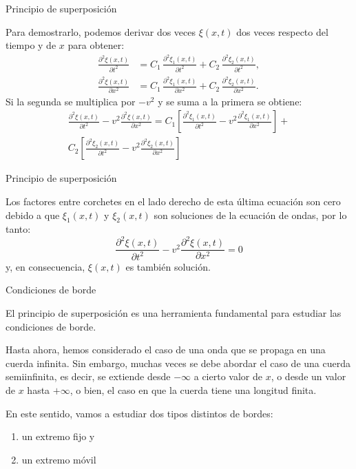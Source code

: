 \documentclass[11pt,handout,aspectratio=1610]{beamer}
\newcommand{\pddiff}[2]{\frac{\partial^2 #1}{\partial #2^2}}
\newcommand{\vs}{\vspace{11pt}}
\begin{document}
\begin{frame}{Principio de superposición}

    Para demostrarlo, podemos derivar dos veces $\xi \left(x,t\right)$ dos veces respecto del tiempo y de $x$ para obtener: 
    \begin{align*}
        \pddiff{\xi \left(x,t\right)}{t} &= C_1 \, \pddiff{\xi_1 \left(x,t\right)}{t} + C_2 \, \pddiff{\xi_2 \left(x,t\right)}{t}, \\
        \pddiff{\xi \left(x,t\right)}{x} &= C_1 \, \pddiff{\xi_1 \left(x,t\right)}{x} + C_2 \, \pddiff{\xi_2 \left(x,t\right)}{x}.
    \end{align*} Si la segunda se multiplica por $-v^2$ y se suma a la primera se obtiene: 
    \begin{multline}
        \pddiff{\xi \left(x,t\right)}{t} - v^2 \pddiff{\xi \left(x,t\right)}{x} = C_1 \left[\pddiff{\xi_1 \left(x,t\right)}{t} - v^2 \pddiff{\xi_1 \left(x,t\right)}{x}\right] + \\ C_2 \left[\pddiff{\xi_2 \left(x,t\right)}{t} - v^2 \pddiff{\xi_2 \left(x,t\right)}{x}\right]
    \end{multline} 
    
\end{frame}

\begin{frame}{Principio de superposición}

    Los factores entre corchetes en el lado derecho de esta última ecuación son cero debido a que $\xi_1 \left(x,t\right)$ y $\xi_2 \left(x,t\right)$ son soluciones de la ecuación de ondas, por lo tanto: $$ \pddiff{\xi \left(x,t\right)}{t} - v^2 \pddiff{\xi \left(x,t\right)}{x} = 0 $$ y, en consecuencia, $\xi \left(x,t\right)$ es también solución.

\end{frame}

\begin{frame}{Condiciones de borde}

    El principio de superposición es una herramienta fundamental para estudiar las condiciones de borde.

    \vs

    Hasta ahora, hemos considerado el caso de una onda que se propaga en una cuerda infinita. Sin embargo, muchas veces se debe abordar el caso de una cuerda semiinfinita, es decir, se extiende desde $-\infty$ a cierto valor de $x$, o desde un valor de $x$ hasta $+\infty$, o bien, el caso en que la cuerda tiene una longitud finita.

    \vs

    En este sentido, vamos a estudiar dos tipos distintos de bordes:
    \begin{enumerate}
        \item un extremo fijo y
        \item un extremo móvil
    \end{enumerate}

\end{frame}
\end{document}
